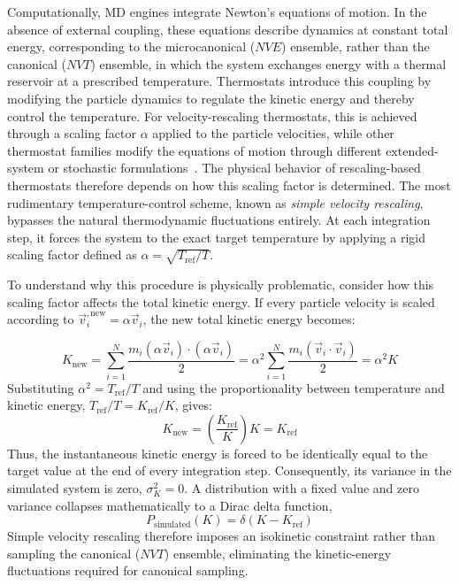 Computationally, MD engines integrate Newton's equations of motion. In the absence of external coupling, these equations describe dynamics at constant total energy, corresponding to the microcanonical ($NVE$) ensemble, rather than the canonical ($NVT$) ensemble, in which the system exchanges energy with a thermal reservoir at a prescribed temperature. Thermostats introduce this coupling by modifying the particle dynamics to regulate the kinetic energy and thereby control the temperature. For velocity-rescaling thermostats, this is achieved through a scaling factor $\alpha$ applied to the particle velocities, while other thermostat families modify the equations of motion through different extended-system or stochastic formulations~\cite{BerendsenB,Vresc}. The physical behavior of rescaling-based thermostats therefore depends on how this scaling factor is determined.
The most rudimentary temperature-control scheme, known as \emph{simple velocity rescaling}, bypasses the natural thermodynamic fluctuations entirely. At each integration step, it forces the system to the exact target temperature by applying a rigid scaling factor defined as $\alpha = \sqrt{T_{\text{ref}}/T}$. 

To understand why this procedure is physically problematic, consider how this scaling factor affects the total kinetic energy. If every particle velocity is scaled according to $\vec{v}_i^{,\mathrm{new}} = \alpha \vec{v}_i$, the new total kinetic energy becomes:

\begin{equation}
K_{\mathrm{new}}
= \sum_{i=1}^{N} \frac{m_i(\alpha\vec{v}_i)\cdot(\alpha\vec{v}_i)}{2}
= \alpha^2 \sum_{i=1}^{N} \frac{m_i(\vec{v}_i\cdot\vec{v}_i)}{2}
= \alpha^2 K
\end{equation}
Substituting $\alpha^2 = T_{\mathrm{ref}}/T$ and using the proportionality between temperature and kinetic energy, $T_{\mathrm{ref}}/T = K_{\mathrm{ref}}/K$, gives:
\begin{equation}
K_{\mathrm{new}}
= \left(\frac{K_{\mathrm{ref}}}{K}\right)K
= K_{\mathrm{ref}}
\end{equation}
Thus, the instantaneous kinetic energy is forced to be identically equal to the target value at the end of every integration step. Consequently, its variance in the simulated system is zero, $\sigma_K^2=0$. A distribution with a fixed value and zero variance collapses mathematically to a Dirac delta function,
\begin{equation}
P_{\mathrm{simulated}}(K)
= \delta(K-K_{\mathrm{ref}})
\end{equation}
Simple velocity rescaling therefore imposes an isokinetic constraint rather than sampling the canonical ($NVT$) ensemble, eliminating the kinetic-energy fluctuations required for canonical sampling.


